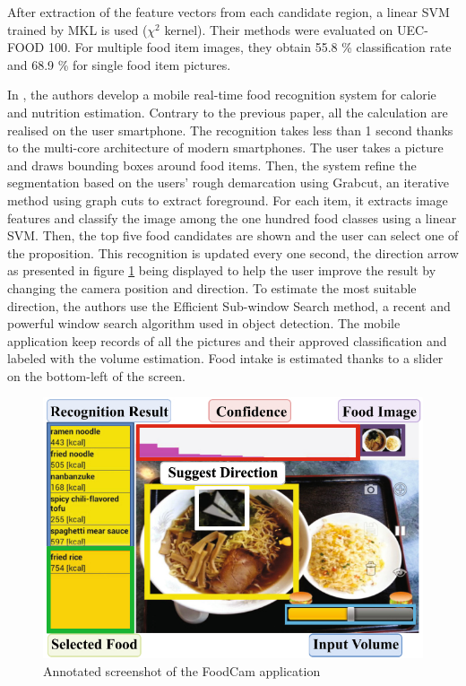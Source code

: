 After extraction of the feature vectors from each candidate region, a linear SVM trained by MKL is used ($\chi^2$ kernel). Their methods were evaluated on UEC-FOOD 100. For multiple food item images, they obtain 55.8 \% classification rate and 68.9 \% for single food item pictures.


In \cite{Kawano2014a}, the authors develop a mobile real-time food recognition system for calorie and nutrition estimation. Contrary to the previous paper, all the calculation are realised on the user smartphone. The recognition takes less than 1 second thanks to the multi-core architecture of modern smartphones.
The user takes a picture and draws bounding boxes around food items. Then, the system refine the segmentation based on the users' rough demarcation using Grabcut, an iterative method using graph cuts to extract foreground.
For each item, it extracts image features and classify the image among the one hundred food classes using a linear SVM. Then, the top five food candidates are shown and the user can select one of the proposition.
This recognition is updated every one second, the direction arrow as presented in figure  \ref{fig:food_cam} being displayed to help the user improve the result by changing the camera position and direction. To estimate the most suitable direction, the authors use the Efficient Sub-window Search method, a recent and powerful window search algorithm used in object detection.
The mobile application keep records of all the pictures and their approved classification and labeled with the volume estimation. Food intake is estimated thanks to a slider on the bottom-left of the screen.

\begin{figure}
    \centering
    \includegraphics[scale=0.6]{img/foodcam.jpg}
    \caption{Annotated screenshot of the FoodCam application}
    \label{fig:food_cam}
\end{figure}

